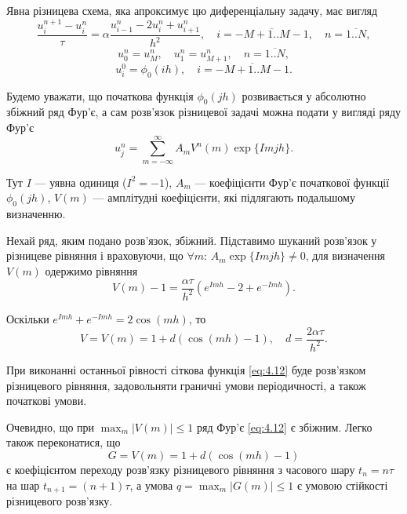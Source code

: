 \begin{proposition}
    Явна різницева схема, яка апроксимує цю диференціальну задачу, має вигляд
    \begin{equation*}
        \frac{u_i^{n + 1} - u_i^n}{\tau} = \alpha \frac{u_{i - 1}^n - 2 u_i^n + u_{i + 1}^n}{h^2}, \quad i = \overline{-M+1..M-1}, \quad n = \overline{1..N},
    \end{equation*}
    \begin{equation*}
        u_0^n = u_M^n, \quad u_1^n = u_{M + 1}^n, \quad n = \overline{1..N},
    \end{equation*}
    \begin{equation*}
        u_i^0 = \phi_0(i h), \quad i = \overline{-M+1..M-1}.
    \end{equation*}
\end{proposition}

Будемо уважати, що початкова функція $\phi_0(j h)$ розвивається у абсолютно збіжний ряд Фур'є, а сам розв'язок різницевої задачі можна подати у вигляді ряду Фур'є
\begin{equation}
    \label{eq:4.12}
    u_j^n = \sum_{m = -\infty}^\infty A_m V^n(m) \exp\{Imjh\}.
\end{equation}

Тут $I$ --- уявна одиниця ($I^2 = -1$), $A_m$ --- коефіцієнти Фур'є початкової функції $\phi_0(jh)$, $V(m)$ --- амплітудні коефіцієнти, які підлягають подальшому визначенню. \medskip

Нехай ряд, яким подано розв'язок, збіжний. Підставимо шуканий розв'язок у різницеве рівняння і враховуючи, що $\forall m$: $A_m \exp\{Imjh\} \ne 0$, для визначення $V(m)$ одержимо рівняння
\begin{equation*}
    V(m) - 1 = \frac{\alpha \tau}{h^2} \left( e^{Imh} - 2 + e^{-Imh} \right).    
\end{equation*}

Оскільки $e^{Imh} + e^{-Imh} = 2 \cos(mh)$, то
\begin{equation*}
    V = V(m) = 1 + d (\cos(m h) - 1), \quad d = \frac{2 \alpha \tau}{h^2}.
\end{equation*}

При виконанні останньої рівності сіткова функція \eqref{eq:4.12} буде розв'язком різницевого рівняння, задовольняти граничні умови періодичності, а також початкові умови. \medskip

Очевидно, що при $\max_m |V(m)| \le 1$ ряд Фур'є \eqref{eq:4.12} є збіжним. Легко також переконатися, що 
\begin{equation*}
    G = V(m) = 1 + d (\cos (m h) - 1)
\end{equation*}
є коефіцієнтом переходу розв'язку різницевого рівняння з часового шару $t_n = n \tau$ на шар $t_{n + 1} = (n + 1) \tau$, а умова $q = \max_m |G(m)| \le 1$  є умовою стійкості різницевого розв'язку. \medskip


